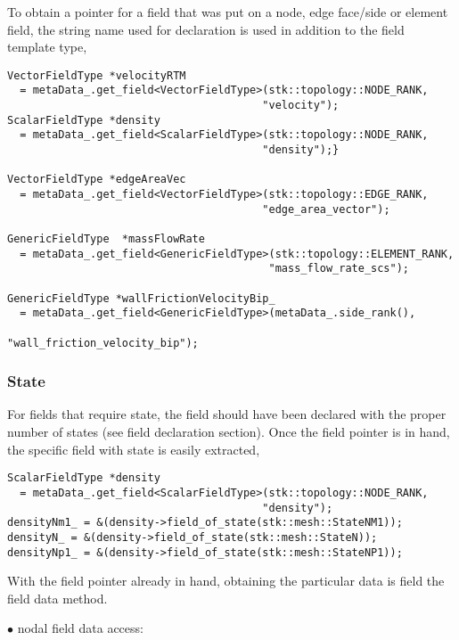 To obtain a pointer for a field that was put on a node, edge face/side or element field, 
the string name used for declaration is used in addition to the field template type,

\begin{lstlisting}
VectorFieldType *velocityRTM 
  = metaData_.get_field<VectorFieldType>(stk::topology::NODE_RANK, 
                                        "velocity");
ScalarFieldType *density 
  = metaData_.get_field<ScalarFieldType>(stk::topology::NODE_RANK, 
                                        "density");}

VectorFieldType *edgeAreaVec 
  = metaData_.get_field<VectorFieldType>(stk::topology::EDGE_RANK, 
                                        "edge_area_vector");

GenericFieldType  *massFlowRate
  = metaData_.get_field<GenericFieldType>(stk::topology::ELEMENT_RANK, 
                                         "mass_flow_rate_scs");

GenericFieldType *wallFrictionVelocityBip_ 
  = metaData_.get_field<GenericFieldType>(metaData_.side_rank(), 
                                         "wall_friction_velocity_bip");
\end{lstlisting}

\subsubsection{State}
For fields that require state, the field should have been declared with the 
proper number of states (see field declaration section). Once the field pointer is 
in hand, the specific field with state is easily extracted,

\begin{lstlisting}
ScalarFieldType *density 
  = metaData_.get_field<ScalarFieldType>(stk::topology::NODE_RANK, 
                                        "density");
densityNm1_ = &(density->field_of_state(stk::mesh::StateNM1));
densityN_ = &(density->field_of_state(stk::mesh::StateN));
densityNp1_ = &(density->field_of_state(stk::mesh::StateNP1));
\end{lstlisting}

With the field pointer already in hand, obtaining the particular data
is field the field data method.

\begin{description}
\item[$\bullet$ nodal field data access:]
\end{description}

